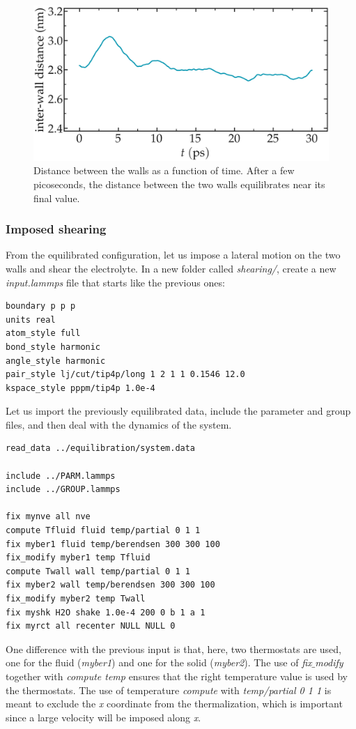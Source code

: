 \documentclass[9pt,tutorial]{livecoms}
\begin{document}
\begin{figure}
\centering
\includegraphics[width=\linewidth]{NANOSHEAR-equilibration}
\caption{Distance between the walls as a function of time. After a few picoseconds, the distance between the two walls equilibrates near its final value.}
\label{fig:NANOSHEAR-equilibration}
\end{figure}

\subsubsection{Imposed shearing}

From the equilibrated configuration, let us impose a lateral motion on the two walls and shear the electrolyte.
In a new folder called \textit{shearing/}, create a new \textit{input.lammps} file that starts like the previous ones:
{\normalsize \begin{verbatim}
boundary p p p
units real
atom_style full
bond_style harmonic
angle_style harmonic
pair_style lj/cut/tip4p/long 1 2 1 1 0.1546 12.0
kspace_style pppm/tip4p 1.0e-4
\end{verbatim}}
Let us import the previously equilibrated data, include the parameter and group files, and then deal with the dynamics of the system.
{\normalsize \begin{verbatim}
read_data ../equilibration/system.data

include ../PARM.lammps
include ../GROUP.lammps

fix mynve all nve
compute Tfluid fluid temp/partial 0 1 1
fix myber1 fluid temp/berendsen 300 300 100
fix_modify myber1 temp Tfluid
compute Twall wall temp/partial 0 1 1
fix myber2 wall temp/berendsen 300 300 100
fix_modify myber2 temp Twall
fix myshk H2O shake 1.0e-4 200 0 b 1 a 1
fix myrct all recenter NULL NULL 0
\end{verbatim}}
One difference with the previous input is that, here, two thermostats are used, one for the fluid (\textit{myber1}) and one for the solid (\textit{myber2}). The use of \textit{fix$\_$modify} together with \textit{compute temp} ensures that the right temperature value is used by the thermostats. The use of temperature \textit{compute} with \textit{temp/partial 0 1 1} is meant to exclude the \textit{x} coordinate from the thermalization, which is important since a large velocity will be imposed along \textit{x}. 
\end{document}
